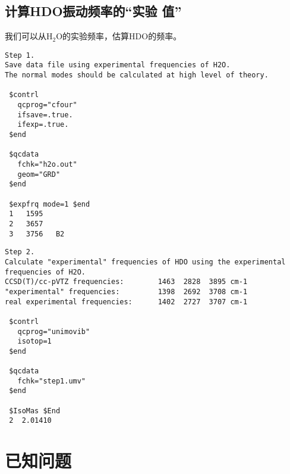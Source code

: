 \documentclass[12pt,a4paper,openany,twoside,cap]{ctexbook}
\begin{document}
\section{计算HDO振动频率的``实验 值''} \label{sec:exp4}

我们可以从H$_2$O的实验频率，估算HDO的频率。

\begin{colorboxed}[oval=false,boxcolor=green!75!black,bgcolor=green!5!white]
\ttfamily\footnotesize
\begin{lstlisting}
Step 1.
Save data file using experimental frequencies of H2O.
The normal modes should be calculated at high level of theory.

 $contrl
   qcprog="cfour"
   ifsave=.true.
   ifexp=.true.
 $end

 $qcdata
   fchk="h2o.out"
   geom="GRD"
 $end

 $expfrq mode=1 $end
 1   1595
 2   3657
 3   3756   B2
\end{lstlisting}\end{colorboxed}

\begin{colorboxed}[oval=false,boxcolor=green!75!black,bgcolor=green!5!white]
\ttfamily\footnotesize
\begin{lstlisting}
Step 2.
Calculate "experimental" frequencies of HDO using the experimental frequencies of H2O.
CCSD(T)/cc-pVTZ frequencies:        1463  2828  3895 cm-1
"experimental" frequencies:         1398  2692  3708 cm-1
real experimental frequencies:      1402  2727  3707 cm-1

 $contrl
   qcprog="unimovib"
   isotop=1
 $end

 $qcdata
   fchk="step1.umv"
 $end

 $IsoMas $End
 2  2.01410
\end{lstlisting}\end{colorboxed}


\chapter{已知问题} \label{part:problem}
\end{document}
